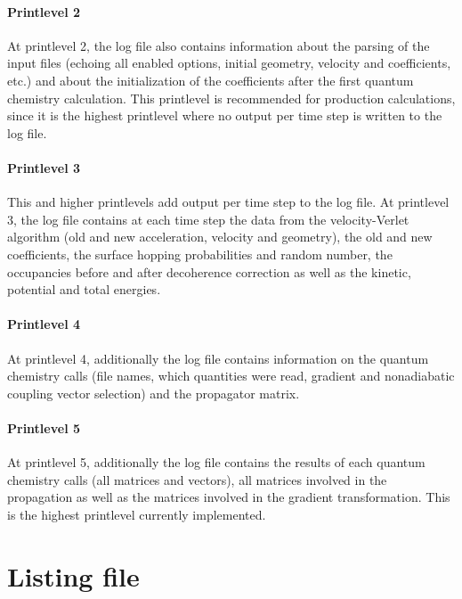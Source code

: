 \documentclass[a4paper,10pt,DIV=15,openany,twoside=false]{scrbook}
\begin{document}
\paragraph{Printlevel 2}

At printlevel 2, the log file also contains information about the parsing of the input files (echoing all enabled options, initial geometry, velocity and coefficients, etc.) and about the initialization of the coefficients after the first quantum chemistry calculation. This printlevel is recommended for production calculations, since it is the highest printlevel where no output per time step is written to the log file.

\paragraph{Printlevel 3}

This and higher printlevels add output per time step to the log file. At printlevel 3, the log file contains at each time step the data from the velocity-Verlet algorithm (old and new acceleration, velocity and geometry), the old and new coefficients, the surface hopping probabilities and random number, the occupancies before and after decoherence correction as well as the kinetic, potential and total energies.

\paragraph{Printlevel 4}

At printlevel 4, additionally the log file contains information on the quantum chemistry calls (file names, which quantities were read, gradient and nonadiabatic coupling vector selection) and the propagator matrix.

\paragraph{Printlevel 5}

At printlevel 5, additionally the log file contains the results of each quantum chemistry calls (all matrices and vectors), all matrices involved in the propagation as well as the matrices involved in the gradient transformation. This is the highest printlevel currently implemented.

\section{Listing file}\label{sec:lisfile}
\end{document}
